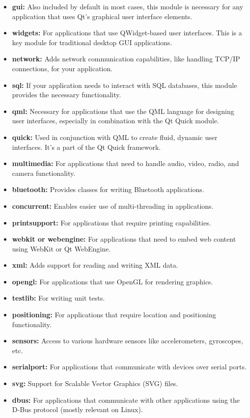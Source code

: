 \documentclass{report}
\begin{document}
\begin{itemize}
\begin{itemize}
                   \item \textbf{gui:} Also included by default in most cases, this module is necessary for any application that uses Qt's graphical user interface elements.
                \item \textbf{widgets:} For applications that use QWidget-based user interfaces. This is a key module for traditional desktop GUI applications.
                \item \textbf{network:} Adds network communication capabilities, like handling TCP/IP connections, for your application.
                \item \textbf{sql:} If your application needs to interact with SQL databases, this module provides the necessary functionality.
                \item \textbf{qml:} Necessary for applications that use the QML language for designing user interfaces, especially in combination with the Qt Quick module.
                \item \textbf{quick:} Used in conjunction with QML to create fluid, dynamic user interfaces. It's a part of the Qt Quick framework.
                \item \textbf{multimedia:} For applications that need to handle audio, video, radio, and camera functionality.
                \item \textbf{bluetooth:} Provides classes for writing Bluetooth applications.
                \item \textbf{concurrent:} Enables easier use of multi-threading in applications.
                \item \textbf{printsupport:} For applications that require printing capabilities.
                \item \textbf{webkit or webengine:} For applications that need to embed web content using WebKit or Qt WebEngine.
                \item \textbf{xml:} Adds support for reading and writing XML data.
                \item \textbf{opengl:} For applications that use OpenGL for rendering graphics.
                \item \textbf{testlib:} For writing unit tests.
                \item \textbf{positioning:} For applications that require location and positioning functionality.
                \item \textbf{sensors:} Access to various hardware sensors like accelerometers, gyroscopes, etc.
                \item \textbf{serialport:} For applications that communicate with devices over serial ports.
                \item \textbf{svg:} Support for Scalable Vector Graphics (SVG) files.
                \item \textbf{dbus:} For applications that communicate with other applications using the D-Bus protocol (mostly relevant on Linux). 
            \end{itemize}
    \end{itemize}
\end{document}
